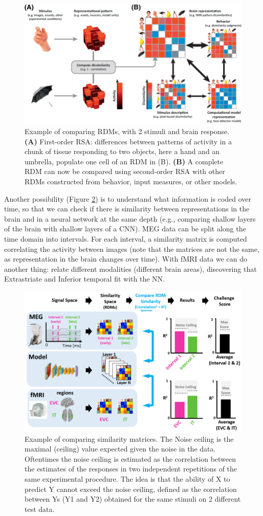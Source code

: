 \begin{figure}[!ht]
    \centering
    \captionsetup{width=.8\linewidth}
    \includegraphics[width=0.7\linewidth]{images/rsa.png}
    \caption{Example of comparing RDMs, with 2 stimuli and brain response. \textbf{(A)} First-order RSA: differences between patterns of activity in a chunk of tissue responding to two objects, here a hand and an umbrella, populate one cell of an RDM in (B). \textbf{(B)} A complete RDM can now be compared using second-order RSA with other RDMs constructed from behavior, input measures, or other models.}
    \label{fig:rsa}
\end{figure}

Another possibility (Figure \ref{fig:rsa_2}) is to understand what information is coded over time, so that we can check if there is similarity between representations in the brain and in a neural network at the same depth (e.g., comparing shallow layers of the brain with shallow layers of a CNN). MEG data can be split along the time domain into intervals. For each interval, a similarity matrix is computed correlating the activity between images (note that the matrices are not the same, as representation in the brain changes over time). With fMRI data we can do another thing: relate different modalities (different brain areas), discovering that Extrastriate and Inferior temporal fit with the NN.\\

\begin{figure}[!ht]
    \centering
    \captionsetup{width=.8\linewidth}
    \includegraphics[width=0.7\linewidth]{images/rsa_2.png}
    \caption{Example of comparing similarity matrices. The Noise ceiling is  the maximal (ceiling) value expected given the noise in the data. Oftentimes the noise ceiling is estimated as the correlation between the estimates of the responses in two independent repetitions of the same experimental procedure. The idea is that the ability of X to predict Y cannot exceed the noise ceiling, defined as the correlation between Ys (Y1 and Y2) obtained for the same stimuli on 2 different test data.}
    \label{fig:rsa_2}
\end{figure}

